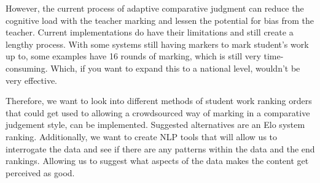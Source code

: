 	However, the current process of adaptive comparative judgment can reduce the cognitive load with the teacher marking and lessen the potential for bias from the teacher. Current implementations do have their limitations and still create a lengthy process. With some systems still having markers to mark student's work up to, some examples have 16 rounds of marking, which is still very time-consuming. Which, if you want to expand this to a national level, wouldn't be very effective.
	
	Therefore, we want to look into different methods of student work ranking orders that could get used to allowing a crowdsourced way of marking in a comparative judgement style, can be implemented. Suggested alternatives are an Elo system ranking. Additionally, we want to create NLP tools that will allow us to interrogate the data and see if there are any patterns within the data and the end rankings. Allowing us to suggest what aspects of the data makes the content get perceived as good.
